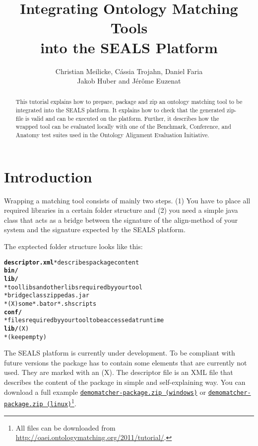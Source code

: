 \documentclass{article}
\begin{document}
\title{Integrating Ontology Matching Tools \\ into the SEALS Platform}

\author{Christian Meilicke, C\'assia Trojahn, Daniel Faria \\ Jakob Huber and J\'er\^ome Euzenat}

\maketitle

\begin{abstract}
This tutorial explains how to prepare, package and zip an ontology matching tool to be integrated into the SEALS platform. It explains how to check that the generated zip-file is valid and can be executed on the platform. Further, it describes how the wrapped tool can be evaluated locally with one of the Benchmark, Conference, and Anatomy test suites used in the Ontology Alignment Evaluation Initiative.
\end{abstract}


\section{Introduction}
\label{sec:intro}

Wrapping a matching tool consists of mainly two steps. (1) You have to place all required libraries in a certain folder structure and (2) you need a simple java class that acts as a bridge between the signature of the align-method of your system and the signature expected by the SEALS platform.

The exptected folder structure looks like this:

\begin{alltt}
\textbf{descriptor.xml}  * describes package content 
\textbf{bin/}
   \textbf{lib/}  
        * tool libs and other libs required by your tool
        * bridge class zipped as .jar
        * (X) some *.bat or *.sh scripts
\textbf{conf/}
        * files required by your tool to be accessed at runtime
\textbf{lib/} (X)
        * (keep empty)
\end{alltt}

The SEALS platform is currently under development. To be compliant with future versions the package has to contain some elements that are currently not used. They are marked with an (X). The descriptor file is an XML file that describes the content of the package in simple and self-explaining way. You can download a full example \href{http://oaei.ontologymatching.org/2011/tutorial/windows/demomatcher-package.zip}{\nolinkurl{demomatcher-package.zip (windows)}} or \href{http://oaei.ontologymatching.org/2011/tutorial/linux/demomatcher-package.zip}{\nolinkurl{demomatcher-package.zip (linux)}}\footnote{All files can be downloaded from \url{http://oaei.ontologymatching.org/2011/tutorial/}.}.
\end{document}
